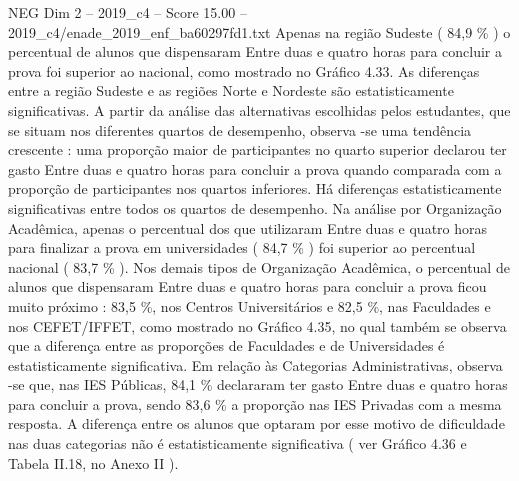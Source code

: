 \begin{textsample}{NEG Dim 2 – 2019\_c4 – Score 15.00 – 2019\_c4/enade\_2019\_enf\_ba60297fd1.txt}
Apenas na região Sudeste ( 84,9 \% ) o percentual de alunos que dispensaram Entre duas e quatro horas para concluir a prova foi superior ao nacional, como mostrado no Gráfico 4.33.
As diferenças entre a região Sudeste e as regiões Norte e Nordeste são estatisticamente significativas.
A partir da análise das alternativas escolhidas pelos estudantes, que se situam nos diferentes quartos de desempenho, observa -se uma tendência crescente : uma proporção maior de participantes no quarto superior declarou ter gasto Entre duas e quatro horas para concluir a prova quando comparada com a proporção de participantes nos quartos inferiores.
Há diferenças estatisticamente significativas entre todos os quartos de desempenho.
Na análise por Organização Acadêmica, apenas o percentual dos que utilizaram Entre duas e quatro horas para finalizar a prova em universidades ( 84,7 \% ) foi superior ao percentual nacional ( 83,7 \% ).
Nos demais tipos de Organização Acadêmica, o percentual de alunos que dispensaram Entre duas e quatro horas para concluir a prova ficou muito próximo : 83,5 \%, nos Centros Universitários e 82,5 \%, nas Faculdades e nos CEFET/IFFET, como mostrado no Gráfico 4.35, no qual também se observa que a diferença entre as proporções de Faculdades e de Universidades é estatisticamente significativa.
Em relação às Categorias Administrativas, observa -se que, nas IES Públicas, 84,1 \% declararam ter gasto Entre duas e quatro horas para concluir a prova, sendo 83,6 \% a proporção nas IES Privadas com a mesma resposta.
A diferença entre os alunos que optaram por esse motivo de dificuldade nas duas categorias não é estatisticamente significativa ( ver Gráfico 4.36 e Tabela II.18, no Anexo II ).

\end{textsample}
